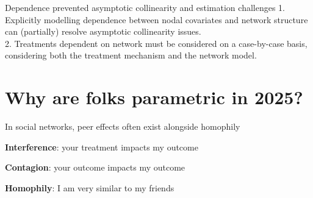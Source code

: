 \documentclass[aspectratio=169]{beamer}
\theoremstyle{remark}
\begin{document}
\begin{frame}{Dependence prevented \textcolor{BrickRed}{asymptotic collinearity} and estimation challenges}
    \large
    1. Explicitly modelling dependence between nodal covariates and network structure can (partially) resolve asymptotic collinearity issues. \\
    \vspace{6mm}
    2. Treatments dependent on network must be considered on a case-by-case basis, considering both the treatment mechanism and the network model.
\end{frame}

\section{Why are folks parametric in 2025?}

\begin{frame}{In social networks, peer effects often exist alongside homophily}
    
    \textbf{Interference}: your treatment impacts my outcome
    
    \textbf{Contagion}: your outcome impacts my outcome
    
    \vspace{8mm}
    
    \textbf{Homophily}: I am very similar to my friends
\end{frame}
\end{document}
